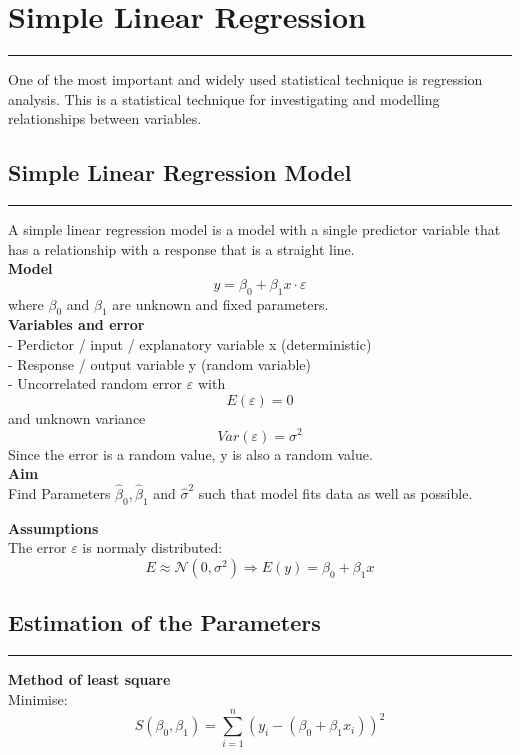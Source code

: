 \section{Simple Linear Regression}
\noindent\rule[\linienAbstand]{\linewidth}{\linienDickeDick}
One of the most important and widely used statistical technique is regression analysis. This is a statistical technique for investigating and modelling relationships between variables.

\subsection{Simple Linear Regression Model}
\noindent\rule[\linienAbstand]{\linewidth}{\linienDicke}
A simple linear regression model is a model with a single predictor variable that has a relationship with a response that is a straight line.\\

\textbf{Model}
\begin{equation}
  y = \beta_0 + \beta_1x \cdot \varepsilon
\end{equation}
where $\beta_0$ and $\beta_1$ are unknown and fixed parameters.\\

\textbf{Variables and error}\\
- Perdictor / input / explanatory variable x (deterministic)\\
- Response / output variable y (random variable)\\
- Uncorrelated random error $\varepsilon $ with
\begin{equation}
  E(\varepsilon ) = 0
\end{equation}
and unknown variance
\begin{equation}
  Var(\varepsilon ) = \sigma^2
\end{equation}
Since the error is a random value, y is also a random value.\\

\textbf{Aim}\\
Find Parameters $\hat{\beta}_0, \hat{\beta}_1$ and $\hat{\sigma}^2$ such that model fits data as well as possible.

\textbf{Assumptions}\\
The error $\varepsilon $ is normaly distributed:
\begin{equation}
  E \approx \mathcal{N}(0, \sigma^2) \Rightarrow E(y) = \beta_0 + \beta_1 x
\end{equation}

\subsection{Estimation of the Parameters}
\noindent\rule[\linienAbstand]{\linewidth}{\linienDicke}
\textbf{Method of least square}\\
Minimise:
\begin{equation}
  S(\beta_0, \beta_1) = \sum_{i=1}^n(y_i-(\beta_0 + \beta_1x_i))^2
\end{equation}

